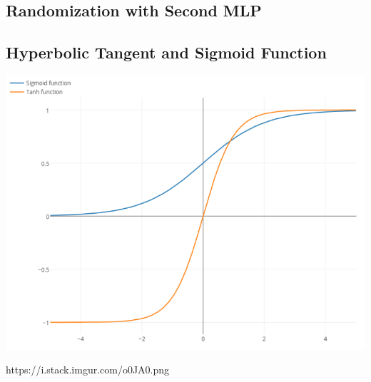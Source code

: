\documentclass[a0,portrait,25pt]{sciposter}
\begin{document}
\begin{multicols}{3}
\begin{mdframed}[backgroundcolor=white,roundcorner=4pt,shadow=true,linewidth=1pt]
\color{Black}
\section*{Randomization with Second MLP}
\end{mdframed}

\begin{mdframed}[backgroundcolor=white,roundcorner=4pt,shadow=true,linewidth=1pt]
\color{Black}
\section*{Hyperbolic Tangent and Sigmoid Function}
\begin{minipage}[c]{1\linewidth}
\includegraphics[width=0.9\linewidth]{fig02}
\end{minipage}
https://i.stack.imgur.com/o0JA0.png
\end{mdframed}

\begin{mdframed}[backgroundcolor=white,roundcorner=4pt,shadow=true,linewidth=1pt]
\color{Black}

\end{mdframed}
\end{multicols}
\end{document}
